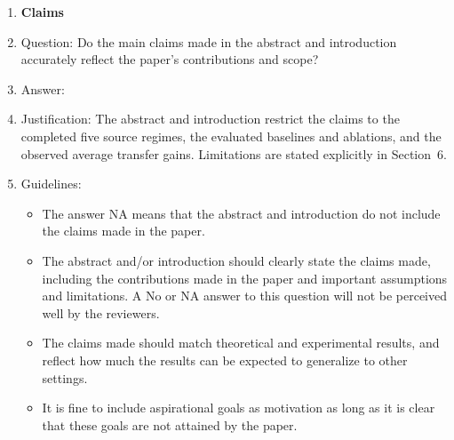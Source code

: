 \documentclass{article}
\begin{document}
\begin{enumerate}

\item {\bf Claims}
    \item[] Question: Do the main claims made in the abstract and introduction accurately reflect the paper's contributions and scope?
    \item[] Answer: \answerYes{}
    \item[] Justification: The abstract and introduction restrict the claims to the completed five source regimes, the evaluated baselines and ablations, and the observed average transfer gains. Limitations are stated explicitly in Section~6.
    \item[] Guidelines:
    \begin{itemize}
        \item The answer NA means that the abstract and introduction do not include the claims made in the paper.
        \item The abstract and/or introduction should clearly state the claims made, including the contributions made in the paper and important assumptions and limitations. A No or NA answer to this question will not be perceived well by the reviewers. 
        \item The claims made should match theoretical and experimental results, and reflect how much the results can be expected to generalize to other settings. 
        \item It is fine to include aspirational goals as motivation as long as it is clear that these goals are not attained by the paper. 
    \end{itemize}


\end{enumerate}
\end{document}
